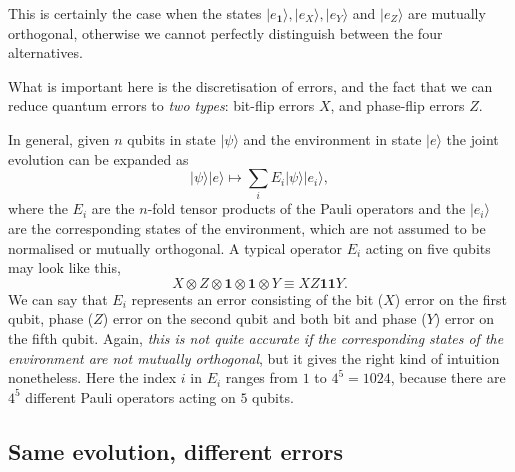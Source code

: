 \documentclass[fleqn]{article}
\newenvironment{idea}{\noindent}{\medskip}
\begin{document}
This is certainly the case when the states \(|e_{\mathbf{1}}\rangle, |e_X\rangle, |e_Y\rangle\) and \(|e_Z\rangle\) are mutually orthogonal, otherwise we cannot perfectly distinguish between the four alternatives.

\begin{idea}
What is important here is the discretisation of errors, and the fact that we can reduce quantum errors to \emph{two types}: bit-flip errors \(X\), and phase-flip errors \(Z\).

\end{idea}

In general, given \(n\) qubits in state \(|\psi\rangle\) and the environment in state \(|e\rangle\) the joint evolution can be expanded as
\[
|\psi\rangle|e\rangle \longmapsto \sum_i E_i|\psi\rangle|e_i\rangle,
\]
where the \(E_i\) are the \(n\)-fold tensor products of the Pauli operators and the \(|e_i\rangle\) are the corresponding states of the environment, which are not assumed to be normalised or mutually orthogonal.
A typical operator \(E_i\) acting on five qubits may look like this,
\[
  X\otimes Z \otimes \mathbf{1}\otimes \mathbf{1}\otimes Y
  \equiv XZ\mathbf{1}\mathbf{1}Y.
\]
We can say that \(E_i\) represents an error consisting of the bit (\(X\)) error on the first qubit, phase (\(Z\)) error on the second qubit and both bit and phase (\(Y\)) error on the fifth qubit.
Again, \emph{this is not quite accurate if the corresponding states of the environment are not mutually orthogonal}, but it gives the right kind of intuition nonetheless.
Here the index \(i\) in \(E_i\) ranges from \(1\) to \(4^5=1024\), because there are \(4^5\) different Pauli operators acting on \(5\) qubits.

\hypertarget{same-evolution-different-errors}{%
\subsection{Same evolution, different errors}\label{same-evolution-different-errors}}
\end{document}
